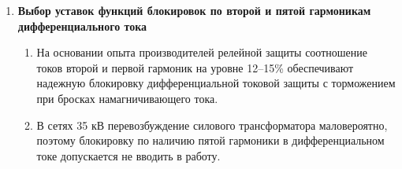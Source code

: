 \begin{enumerate}[label=\arabic{section}.\arabic{enumi}, labelsep=7pt, leftmargin=0pt, itemindent=60pt, align=left, nosep]
\begin{enumerate}[label=\arabic{section}.\arabic{enumi}.\arabic*, labelsep=7pt, leftmargin=0em, itemindent=55.5pt, align=left, nosep]
\begin{itemize}
\item Вычисление ординаты пересечения расчетной прямой с тормозной характеристикой:
\begin{equation}
    \label{eq:dzt921}
    I_{\textsl{дифф, тх*}} = \frac {I_{\textsl{дифф}} }{k_{\textsl{ч}} },
\end{equation}
\item Контроль граничного условия участка. Полученное значение должно быть меньше или равно верхней границе первого наклонного участка:
\begin{equation}
    \label{eq:dzt922}
    I_{\textsl{дифф, тх*}} \leq I_{\textsl{ср(ДТЗт)}} + k_{\textsl{т1} \cdot (I_{\textsl{т2}}-I_{\textsl{т1}})}, 
\end{equation}
Если неравенство не выполняется (ордината пересечения выше границы участка), использование данной аналитической формулы неправомерно, и требуется корректировка уставок излома характеристики.

\end{itemize}


\end{enumerate}

\item \textbf{Выбор уставок функций блокировок по второй и пятой гармоникам дифференциального тока}

\begin{enumerate}[label=\arabic{section}.\arabic{enumi}.\arabic*, labelsep=7pt, leftmargin=0em, itemindent=55.5pt, align=left, nosep]
\item
На основании опыта производителей релейной защиты соотношение токов второй и первой гармоник на уровне 12–15\% обеспечивают надежную блокировку дифференциальной токовой защиты с торможением при бросках намагничивающего тока.
\item
В сетях 35 кВ перевозбуждение силового трансформатора маловероятно, поэтому блокировку по наличию пятой гармоники в дифференциальном токе допускается не вводить в работу.
\end{enumerate}


\end{enumerate}
